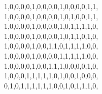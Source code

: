 1,0,0,0,0,1,0,0,0,0,1,0,0,0,0,1,1,\\
1,0,0,0,0,1,0,0,0,0,1,0,1,0,0,1,1,\\
1,0,0,0,0,1,0,0,0,0,1,0,1,1,1,1,0,\\
1,0,0,0,0,1,0,0,0,0,1,0,1,1,0,1,0,\\
1,0,0,0,0,1,0,0,1,1,0,1,1,1,1,0,0,\\
1,0,0,0,0,1,0,0,0,0,1,1,1,1,1,0,0,\\
1,0,0,0,0,1,0,0,1,1,1,0,0,0,0,1,0,\\
1,0,0,0,1,1,1,1,1,0,1,0,0,1,0,0,0,\\
0,1,0,1,1,1,1,1,1,0,0,1,0,1,1,1,0,\\

